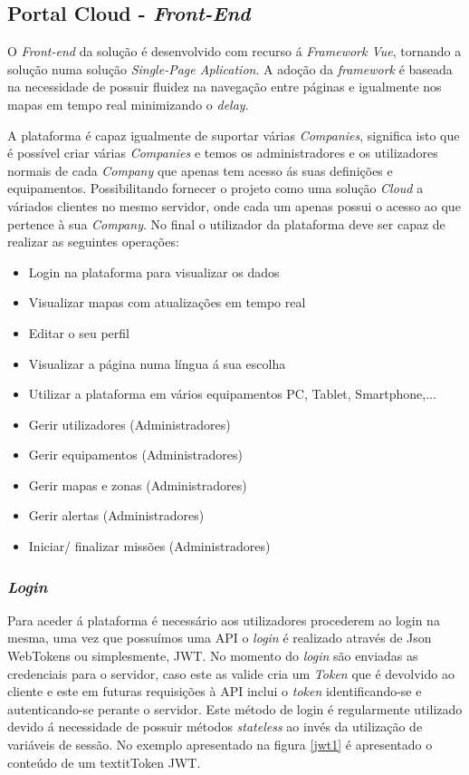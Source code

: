 \subsection {Portal Cloud - \textit{Front-End}}

\par O \textit{Front-end} da solução é desenvolvido com recurso á \textit{Framework Vue}, tornando a solução numa solução \textit{Single-Page Aplication}. A adoção da \textit{framework} é baseada na necessidade de possuir fluidez na navegação entre páginas e igualmente nos mapas em tempo real minimizando o \textit{delay}.
\par A plataforma é capaz igualmente de suportar várias \textit{Companies}, significa isto que é possível criar várias \textit{Companies} e temos os administradores e os utilizadores normais de cada \textit{Company} que apenas tem acesso ás suas definições e equipamentos. Possibilitando fornecer o projeto como uma solução \textit{Cloud} a váriados clientes no mesmo servidor, onde cada um apenas possui o acesso ao que pertence à sua \textit{Company}.
No final o utilizador da plataforma deve ser capaz de realizar as seguintes operações:
\par
\begin{itemize}
\item Login na plataforma para visualizar os dados
\item Visualizar mapas com atualizações em tempo real
\item Editar o seu perfil
\item Visualizar a página numa língua á sua escolha
\item Utilizar a plataforma em vários equipamentos PC, Tablet, Smartphone,...
\item Gerir utilizadores (Administradores)
\item Gerir equipamentos (Administradores)
\item Gerir mapas e zonas (Administradores)
\item Gerir alertas (Administradores)
\item Iniciar/ finalizar missões (Administradores)
\end{itemize}


\subsubsection{\textit{Login}}
\par Para aceder á plataforma é necessário aos utilizadores procederem ao login na mesma, uma vez que possuímos uma API o \textit{login} é realizado através de Json WebTokens ou simplesmente, JWT. No momento do \textit{login} são enviadas as credenciais para o servidor, caso este as valide cria um \textit{Token} que é devolvido ao cliente e este em futuras requisições à API inclui o \textit{token} identificando-se e autenticando-se perante o servidor. Este método de login é regularmente utilizado devido á necessidade de possuir métodos \textit{stateless} ao invés da utilização de variáveis de sessão. No exemplo apresentado na figura \ref{jwt1} é apresentado o conteúdo de um textit{Token} JWT. 


